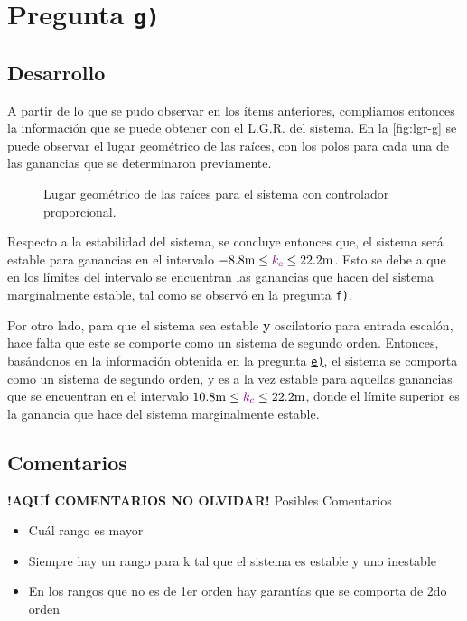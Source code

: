\section{Pregunta \texttt{g)}}\label{pregunta-g}
\subsection{Desarrollo}

A partir de lo que se pudo observar en los ítems anteriores, compliamos entonces
la información que se puede obtener con el L.G.R. del sistema. En la \autoref{fig:lgr-g}
se puede observar el lugar geométrico de las raíces, con los polos para cada una
de las ganancias que se determinaron previamente.

\begin{figure}[ht]
  \centering
  
  \caption{Lugar geométrico de las raíces para el sistema con controlador proporcional.}
  \label{fig:lgr-g}
\end{figure}

Respecto a la estabilidad del sistema, se concluye entonces que, el sistema será
estable para ganancias en el intervalo $-8.8\unit{m} \leq \mora{k_{c}} \leq 22.2\unit{m}$.
Esto se debe a que en los límites del intervalo se encuentran las ganancias que
hacen del sistema marginalmente estable, tal como se observó en la pregunta
\hyperref[pregunta-f]{\texttt{f)}}.

Por otro lado, para que el sistema sea estable \textbf{y} oscilatorio para entrada
escalón, hace falta que este se comporte como un sistema de segundo orden. Entonces,
basándonos en la información obtenida en la pregunta \hyperref[pregunta-e]{\texttt{e)}},
el sistema se comporta como un sistema de segundo orden, y es a la vez estable para
aquellas ganancias que se encuentran en el intervalo $10.8\unit{m} \leq \mora{k_{c}} \leq 22.2\unit{m}$,
donde el límite superior es la ganancia que hace del sistema marginalmente estable.


\FloatBarrier
\subsection{Comentarios}


\textbf{!AQUÍ COMENTARIOS NO OLVIDAR!}
Posibles Comentarios
\begin{itemize}
    \item Cuál rango es mayor
    \item Siempre hay un rango para k tal que el sistema es estable y uno inestable
    \item En los rangos que no es de 1er orden hay garantías que se comporta de 2do orden
\end{itemize}
